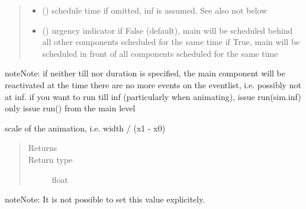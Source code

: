 \documentclass[letterpaper,10pt,english]{sphinxmanual}
\begin{document}
\begin{fulllineitems}
\begin{fulllineitems}
\begin{quote}
\begin{description}
\begin{itemize}
\item {} 
 () \textendash{} schedule time 
if omitted, inf is assumed. See also not below

\item {} 
 () \textendash{} urgency indicator 
if False (default), main will be scheduled
behind all other components scheduled
for the same time 
if True, main will be scheduled
in front of all components scheduled
for the same time

\end{itemize}

\end{description}\end{quote}

\begin{sphinxadmonition}{note}{Note:}
if neither till nor duration is specified, the main component will be reactivated at
the time there are no more events on the eventlist, i.e. possibly not at inf. 
if you want to run till inf (particularly when animating), issue run(sim.inf) 
only issue run() from the main level
\end{sphinxadmonition}

\end{fulllineitems}


\begin{fulllineitems}
\label{\detokenize{Reference:salabim.Environment.scale}}
scale of the animation, i.e. width / (x1 - x0)
\begin{quote}\begin{description}
\item[{Returns}] \leavevmode
{}

\item[{Return type}] \leavevmode
float

\end{description}\end{quote}

\begin{sphinxadmonition}{note}{Note:}
It is not possible to set this value explicitely.
\end{sphinxadmonition}

\end{fulllineitems}



\end{fulllineitems}
\end{document}
